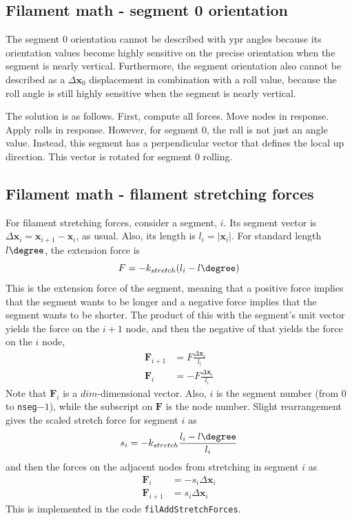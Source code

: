 \documentclass {scrbook}
\newcommand {\ttt} {\texttt}
\begin{document}
\subsection{Filament math - segment 0 orientation}

The segment 0 orientation cannot be described with ypr angles because its orientation values become highly sensitive on the precise orientation when the segment is nearly vertical. Furthermore, the segment orientation also cannot be described as a $\Delta \bm{x}_0$ displacement in combination with a roll value, because the roll angle is still highly sensitive when the segment is nearly vertical.

The solution is as follows. First, compute all forces. Move nodes in response. Apply rolls in response. However, for segment 0, the roll is not just an angle value. Instead, this segment has a perpendicular vector that defines the local up direction. This vector is rotated for segment 0 rolling.



\subsection{Filament math - filament stretching forces}

For filament stretching forces, consider a segment, $i$. Its segment vector is $\Delta \bm{x}_i = \bm{x}_{i+1}-\bm{x}_i$, as usual. Also, its length is $l_i = | \bm{x}_i |$. For standard length $l\degree$, the extension force is
$$F = - k_{stretch} (l_i - l\degree)$$
This is the extension force of the segment, meaning that a positive force implies that the segment wants to be longer and a negative force implies that the segment wants to be shorter. The product of this with the segment's unit vector yields the force on the $i+1$ node, and then the negative of that yields the force on the $i$ node,
\begin{align*}
\bm{F}_{i+1} &= F \frac{\Delta \bm{x}_i}{l_i} \\
\bm{F}_{i} &= - F \frac{\Delta \bm{x}_i}{l_i}
\end{align*}
Note that $\bm{F}_i$ is a $dim$-dimensional vector. Also, $i$ is the segment number (from 0 to \ttt{nseg}$-1$), while the subscript on $\bm{F}$ is the node number. Slight rearrangement gives the scaled stretch force for segment $i$ as
$$s_i = - k_{stretch} \frac{l_i - l\degree}{l_i}$$
and then the forces on the adjacent nodes from stretching in segment $i$ as
\begin{align}
\bm{F}_{i} &= - s_i \Delta \bm{x}_i \nonumber \\
\bm{F}_{i+1} &= s_i \Delta \bm{x}_i
\label{eq:FilStretchForce}
\end{align}
This is implemented in the code \ttt{filAddStretchForces}.
\end{document}

